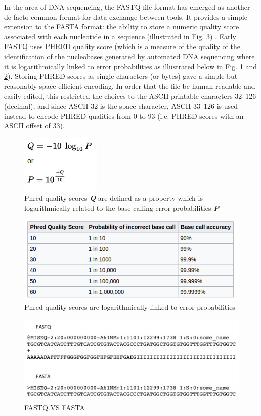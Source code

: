 \documentclass[12pt]{llncs}
\begin{document}
In the area of DNA sequencing, the FASTQ file format has emerged as another de facto common format for data exchange between tools. It provides a simple extension to the FASTA format: the ability to store a numeric quality score associated with each nucleotide in a sequence (illustrated in Fig. \ref{fig:fig-NGS-6}) \cite{fasta-fastq2}. 
Early FASTQ uses PHRED quality score (which is a measure of the quality of the identification of the nucleobases generated by automated DNA sequencing where it is logarithmically linked to error probabilities as illustrated below in Fig. \ref{fig:fig-NGS-3} and \ref{fig:fig-NGS-4}). Storing PHRED scores as single characters (or bytes) gave a simple but reasonably space efficient encoding. In order that the file be human readable and easily edited, this restricted the choices to the ASCII printable characters 32–126 (decimal), and since ASCII 32 is the space character, ASCII 33–126 is used instead to encode PHRED qualities from 0 to 93 (i.e. PHRED scores with an ASCII offset of 33).


\begin{figure}
	\centering
	\includegraphics{./figs/NGS-3}
	\caption{\label{fig:fig-NGS-3}Phred quality scores 
	\textit{\textbf{Q}} are defined as a property which is logarithmically related to the base-calling error probabilities \textit{\textbf{P}}}
\end{figure}
\begin{figure}
	\centering
	\includegraphics[width=.911\linewidth]{./figs/NGS-4}
	\caption{\label{fig:fig-NGS-4}Phred quality scores are logarithmically linked to error probabilities}
\end{figure}

\begin{figure}
	\centering
	\includegraphics[width=.911\linewidth]{./figs/NGS-6}
	\caption{\label{fig:fig-NGS-6}FASTQ VS FASTA}
\end{figure}
\end{document}
